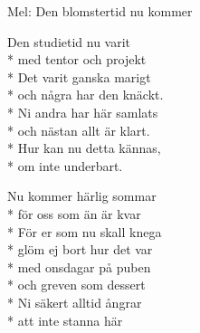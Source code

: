 \begin{SongText}[Avslutningssången]
    \begin{SongInfo}
        Mel: Den blomstertid nu kommer
    \end{SongInfo}
    \begin{SongVerse}
        Den studietid nu varit\\*%
        med tentor och projekt\\*%
        Det varit ganska marigt\\*%
        och några har den knäckt.\\*%
        Ni andra har här samlats\\*%
        och nästan allt är klart.\\*%
        Hur kan nu detta kännas,\\*%
        om inte underbart.
    \end{SongVerse}
    \begin{SongVerse}
        Nu kommer härlig sommar\\*%
        för oss som än är kvar\\*%
        För er som nu skall knega\\*%
        glöm ej bort hur det var\\*%
        med onsdagar på puben\\*%
        och greven som dessert\\*%
        Ni säkert alltid ångrar\\*%
        att inte stanna här
    \end{SongVerse}
\end{SongText}
